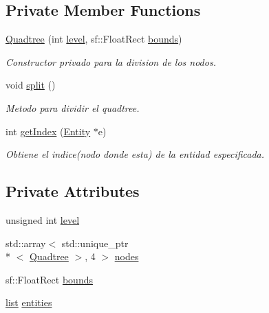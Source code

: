 \subsection*{Private Member Functions}
\begin{DoxyCompactItemize}
\item 
\hyperlink{classant_1_1_utils_1_1_quadtree_ae48089152524a9c3ec84184bcc8a45a7}{Quadtree} (int \hyperlink{classant_1_1_utils_1_1_quadtree_afae97d3832d54987e09661dd7c14cfc6}{level}, sf\+::\+Float\+Rect \hyperlink{classant_1_1_utils_1_1_quadtree_a1b9aecf327adee874486c11a56ce5334}{bounds})
\begin{DoxyCompactList}\small\item\em Constructor privado para la division de los nodos. \end{DoxyCompactList}\item 
void \hyperlink{classant_1_1_utils_1_1_quadtree_abbe98f5025b0127b91c97142237f13db}{split} ()
\begin{DoxyCompactList}\small\item\em Metodo para dividir el quadtree. \end{DoxyCompactList}\item 
int \hyperlink{classant_1_1_utils_1_1_quadtree_a9a6fd9ec9d64fbb7e272828159241445}{get\+Index} (\hyperlink{classant_1_1_entity}{Entity} $\ast$e)
\begin{DoxyCompactList}\small\item\em Obtiene el indice(nodo donde esta) de la entidad especificada. \end{DoxyCompactList}\end{DoxyCompactItemize}
\subsection*{Private Attributes}
\begin{DoxyCompactItemize}
\item 
unsigned int \hyperlink{classant_1_1_utils_1_1_quadtree_afae97d3832d54987e09661dd7c14cfc6}{level}
\item 
std\+::array$<$ std\+::unique\+\_\+ptr\\*
$<$ \hyperlink{classant_1_1_utils_1_1_quadtree}{Quadtree} $>$, 4 $>$ \hyperlink{classant_1_1_utils_1_1_quadtree_a188cbcea719019bfefe8adb050a51718}{nodes}
\item 
sf\+::\+Float\+Rect \hyperlink{classant_1_1_utils_1_1_quadtree_a1b9aecf327adee874486c11a56ce5334}{bounds}
\item 
\hyperlink{classant_1_1_utils_1_1_quadtree_a744668597e9815bc6cdeb44a48f527dd}{list} \hyperlink{classant_1_1_utils_1_1_quadtree_af71256d6656bfde8f416e5a34bc71607}{entities}
\end{DoxyCompactItemize}
